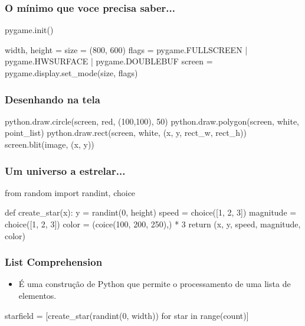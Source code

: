 \begin{frame}[fragile]
    \frametitle{O mínimo que voce precisa saber...}

    \begin{python}
    pygame.init()

    width, height = size = (800, 600)
    flags = pygame.FULLSCREEN | pygame.HWSURFACE | pygame.DOUBLEBUF
    screen = pygame.display.set_mode(size, flags)
    \end{python}
\end{frame}

\begin{frame}[fragile]
    \frametitle{Desenhando na tela}
    \begin{python}
        python.draw.circle(screen, red, (100,100), 50)
        python.draw.polygon(screen, white, point_list)
        python.draw.rect(screen, white, (x, y, rect_w, rect_h))
        screen.blit(image, (x, y))
    \end{python}
\end{frame}

\begin{frame}[fragile]
    \frametitle{Um universo a estrelar...}

    \begin{python}
    from random import randint, choice

    def create_star(x):
        y = randint(0, height)
        speed = choice([1, 2, 3])
        magnitude = choice([1, 2, 3])
        color = (coice(100, 200, 250),) * 3
        return (x, y, speed, magnitude, color)
    \end{python}
\end{frame}

\begin{frame}[fragile]
    \frametitle{List Comprehension}

    \begin{itemize}
        \item É uma construção de Python que permite o processamento de
        uma lista de elementos.
    \end{itemize}

    \begin{python}
    starfield = [create_star(randint(0, width))
                 for star in range(count)]
    \end{python}
\end{frame}

